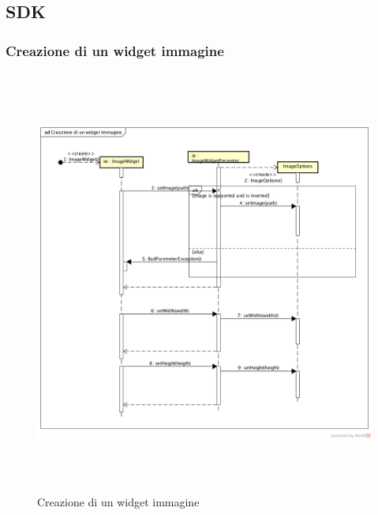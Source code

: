 \subsection{SDK}

\subsubsection{Creazione di un widget immagine}

\label{Creazione di un widget immagine}
\begin{figure}[ht]
	\centering
	\includegraphics[width=16cm, height=14cm]{Sezioni/Diagrammi/SDK/Creazione di un widget immagine.png}
	\caption{Creazione di un widget immagine}
\end{figure}

